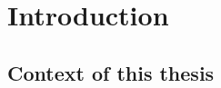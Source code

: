 
\chapter{Introduction}
\label{chapter:1}

\graphicspath{{2-Chapters/1-Chapter/Images/}}


\section{Context of this thesis}
